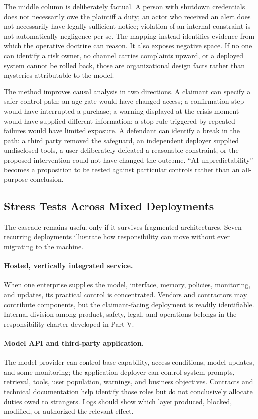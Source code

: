 The middle column is deliberately factual. A person with shutdown credentials does not necessarily owe the plaintiff a duty; an actor who received an alert does not necessarily have legally sufficient notice; violation of an internal constraint is not automatically negligence per se. The mapping instead identifies evidence from which the operative doctrine can reason. It also exposes negative space. If no one can identify a risk owner, no channel carries complaints upward, or a deployed system cannot be rolled back, those are organizational design facts rather than mysteries attributable to the model.

The method improves causal analysis in two directions. A claimant can specify a safer control path: an age gate would have changed access; a confirmation step would have interrupted a purchase; a warning displayed at the crisis moment would have supplied different information; a stop rule triggered by repeated failures would have limited exposure. A defendant can identify a break in the path: a third party removed the safeguard, an independent deployer supplied undisclosed tools, a user deliberately defeated a reasonable constraint, or the proposed intervention could not have changed the outcome. ``AI unpredictability'' becomes a proposition to be tested against particular controls rather than an all-purpose conclusion.

\subsection{Stress Tests Across Mixed Deployments}

The cascade remains useful only if it survives fragmented architectures. Seven recurring deployments illustrate how responsibility can move without ever migrating to the machine.

\paragraph{Hosted, vertically integrated service.}
When one enterprise supplies the model, interface, memory, policies, monitoring, and updates, its practical control is concentrated. Vendors and contractors may contribute components, but the claimant-facing deployment is readily identifiable. Internal division among product, safety, legal, and operations belongs in the responsibility charter developed in Part V.

\paragraph{Model API and third-party application.}
The model provider can control base capability, access conditions, model updates, and some monitoring; the application deployer can control system prompts, retrieval, tools, user population, warnings, and business objectives. Contracts and technical documentation help identify those roles but do not conclusively allocate duties owed to strangers. Logs should show which layer produced, blocked, modified, or authorized the relevant effect.

